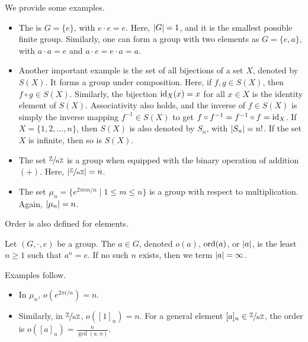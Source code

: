 We provide some examples.

\begin{example}
    \begin{itemize}
        \item The  is $G = \{e\}$, with $e \cdot e = e$. Here, $\left| G \right| = 1$, and it is the smallest possible finite group. Similarly, one can form a group with two elements as $G = \{e,a\}$, with $a \cdot a = e$ and $a \cdot e = e \cdot a = a$.
        
        \item Another important example is the set of all bijections of a set $X$, denoted by $S(X)$. It forms a group under composition. Here, if $f,g \in S(X)$, then $f \circ g \in S(X)$. Similarly, the bijection $\operatorname{id}_{X}(x) = x$ for all $x \in X$ is the identity element of $S(X)$. Associativity also holds, and the inverse of $f \in S(X)$ is simply the inverse mapping $f^{-1} \in S(X)$ to get $f \circ f^{-1} = f^{-1} \circ f = \operatorname{id}_{X}$. If $X = \{1,2,\ldots,n\}$, then $S(X)$ is also denoted by $S_{n}$, with $\left| S_{n} \right| = n!$. If the set $X$ is infinite, then so is $S(X)$.
        
        \item The set $\sfrac{\mathbb{Z}}{n\mathbb{Z}}$ is a group when equipped with the binary operation of addition $(+)$. Here, $\left| \sfrac{\mathbb{Z}}{n\mathbb{Z}} \right| = n$.
        
        \item The set $\mu_{n} = \{e^{2\pi im/n} \mid 1 \leq m \leq n\}$ is a group with respect to multiplication. Again, $\left| \mu_{n} \right| = n$.
    \end{itemize}
\end{example}

Order is also defined for elements.

\begin{definition}
    Let $(G,\cdot,e)$ be a group. The  $a \in G$, denoted $o(a)$, $\operatorname{ord}(a)$, or $\left| a \right|$, is the least $n \geq 1$ such that $a^{n} = e$. If no such $n$ exists, then we term $\left| a \right| = \infty$.
\end{definition}

Examples follow.

\begin{example}
    \begin{itemize}
        \item In $\mu_{n}$, $o(e^{2\pi i/n}) = n$.
        
        \item Similarly, in $\sfrac{\mathbb{Z}}{n\mathbb{Z}}$, $o([1]_{n}) = n$. For a general element $[a]_{n} \in \sfrac{\mathbb{Z}}{n\mathbb{Z}}$, the order is $o([a]_{n}) = \frac{n}{\gcd(a,n)}$.
    \end{itemize}
\end{example}

